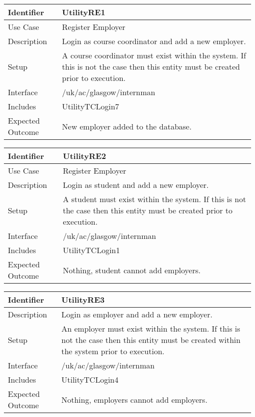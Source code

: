 \begin{tabularx}{\textwidth}{|T|L|}
\hline
Identifier & UtilityRE1\\
\hline
Use Case & Register Employer \\
\hline
Description & Login as course coordinator and add a new employer.\\
\hline
Setup & A course coordinator must exist within the system. If this is
not the case then this entity must be created prior to execution. \\
\hline
Interface & /uk/ac/glasgow/internman \\
\hline
Includes & UtilityTCLogin7 \\
\hline
Expected Outcome & New employer added to the database.\\
\hline
\end{tabularx}

\vspace{2em}

\begin{tabularx}{\textwidth}{|T|L|}
\hline
Identifier & UtilityRE2\\
\hline
Use Case & Register Employer \\
\hline
Description & Login as student and add a new employer.\\
\hline
Setup & A student must exist within the system. If this is not the
case then this entity must be created prior to execution.  \\
\hline
Interface & /uk/ac/glasgow/internman \\
\hline
Includes & UtilityTCLogin1 \\
\hline
Expected Outcome & Nothing, student cannot add employers.\\
\hline
\end{tabularx}

\vspace{2em}

\begin{tabularx}{\textwidth}{|T|L|}
\hline
Identifier & UtilityRE3\\
\hline
Description & Login as employer and add a new employer.\\
\hline
Setup & An employer must exist within the system. If this is not the
case then this entity must be created within the system prior to execution. \\
\hline
Interface & /uk/ac/glasgow/internman \\
\hline
Includes & UtilityTCLogin4 \\
\hline
Expected Outcome & Nothing, employers cannot add employers.\\
\hline
\end{tabularx}

